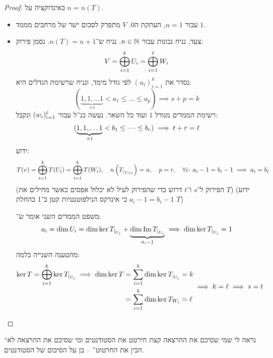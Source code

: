\documentclass[]{../../../../tex/classes/styledArticle}
\begin{document}
    \begin{proof}
        באינדוקציה על $n  = n(T)$. 
        \begin{itemize}
            \item עבור $n = 1$, העתקת ה‏$0$. $V$ מתפרק לסכום ישר של מרחבים מממד $1$. 
            \item צעד, נניח נכונות עבור $n \in \mathbb{N}$. נניח ש־$n(T) = n + 1$. נסמן פירוק: 
            \[ V = \bigoplus_{i = 1}^{k} U_i = \bigoplus_{i = 1}^{\ell} W_i \]
            נסדר את $(u_i)_{i =1}^{k}$ לפי גודל מימד, ונניח שרשימת הגדלים היא: 
            \[ (\underbrace{1, 1, \dots 1 }_{\times s}< a_1 \le \dots \le a_{p}) \implies s + p = k \]
           רשימת הממדים מגודל $1$ ועוד כל השאר. נעשה כנ''ל עבור $(w_i)_{i = 1}^{\ell}$ ונקבל: 
            \[ (\underbrace{1, 1, \dots 1}_{\times t} < b_1 \le \dots \le b_r) \implies t + r = \ell \]
            ידוע:
            \[ T(v) = \bigoplus_{i = 1}^{k} T(U_i) = \bigoplus_{i = 1}^{k} T(W_i), \quad n\left ( T_{|_{T(v)}} \right ) = n, \quad p = r, \quad \forall i \colon a_i - 1 = b_i - 1 \implies a_i = b_i \]
            (הפירוק ל־$s$ ו־$t$ דרוש כדי שהפירוק לעיל לא יכלול אפסים כאשר מחילים את $T$)
            (ידוע $a_i - 1 = b_i - 1$ כי אינדקס הנילפוטנטיות קטן ב־1 בהחלת $T$)
            
            משפט הממדים השני אומר ש־: 
            \[ a_i = \dim U_i = \dim \ker T_{|_{U_i}} + \underbrace{\dim \operatorname{Im} T_{|_{U_i}}}_{a_i - 1} \implies \dim \ker T_{|_{U_i}} = 1 \]
            מהטענה השנייה בלמה: 
            \[ \begin{aligned}
                \ker T = \bigoplus_{i = 1}^{k} \ker T_{|_{U_i}} \implies \dim \ker T &= \sum_{i = 1}^k \dim \ker T_{|_{U_i}} = k \\
                &= \sum_{i = 1}^{k} \dim \ker T_{W_i} = \ell
            \end{aligned}\implies k = \ell \implies s = t \]
        \end{itemize}
    \end{proof}
    
    ``נראה לי שמי שסיכם את ההרצאה קצת חירטט את הסטודנטים ומי שסיכם את ההרצאה לא הבין את החרטוט'' – בן על הסיכום של הסטודנטים. 
    
    \ndoc
\end{document}
